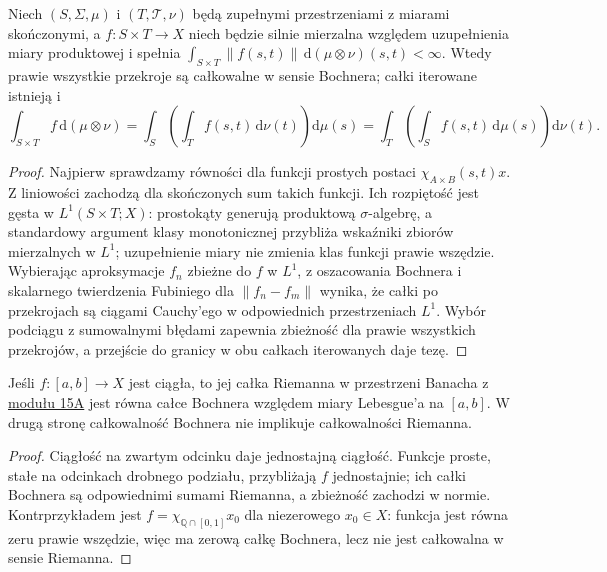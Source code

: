 \begin{twierdzenie}
\label{thm:bochner-fubini15b}
Niech $(S,\Sigma,\mu)$ i $(T,\mathcal T,\nu)$ będą
zupełnymi przestrzeniami z miarami skończonymi, a
$f:S\times T\to X$ niech będzie silnie mierzalna względem
uzupełnienia miary produktowej i spełnia
$\int_{S\times T}\|f(s,t)\|\,\mathrm d(\mu\otimes\nu)(s,t)<\infty$.
Wtedy prawie wszystkie przekroje są całkowalne w sensie
Bochnera; całki iterowane istnieją i
\[
 \int_{S\times T}f\,\mathrm d(\mu\otimes\nu)
 =\int_S\left(\int_Tf(s,t)\,\mathrm d\nu(t)\right)\mathrm d\mu(s)
 =\int_T\left(\int_Sf(s,t)\,\mathrm d\mu(s)\right)\mathrm d\nu(t).
\]
\end{twierdzenie}
\begin{proof}
Najpierw sprawdzamy równości dla funkcji prostych postaci
$\chi_{A\times B}(s,t)x$. Z liniowości zachodzą dla
skończonych sum takich funkcji. Ich rozpiętość jest gęsta
w $L^1(S\times T;X)$: prostokąty generują produktową
$\sigma$-algebrę, a standardowy argument klasy monotonicznej
przybliża wskaźniki zbiorów mierzalnych w $L^1$;
uzupełnienie miary nie zmienia klas funkcji prawie wszędzie.
Wybierając aproksymacje $f_n$ zbieżne do $f$ w $L^1$,
z oszacowania Bochnera i skalarnego twierdzenia Fubiniego
dla $\|f_n-f_m\|$ wynika, że całki po przekrojach są
ciągami Cauchy'ego w odpowiednich przestrzeniach $L^1$.
Wybór podciągu z sumowalnymi błędami zapewnia zbieżność
dla prawie wszystkich przekrojów, a przejście do granicy
w obu całkach iterowanych daje tezę.
\end{proof}

\begin{stwierdzenie}
\label{prop:riemann-bochner15b}
Jeśli $f:[a,b]\to X$ jest ciągła, to jej całka Riemanna
w przestrzeni Banacha z \hyperref[sec:integral-lcs15a]{modułu 15A} jest równa całce Bochnera
względem miary Lebesgue'a na $[a,b]$. W drugą stronę
całkowalność Bochnera nie implikuje całkowalności Riemanna.
\end{stwierdzenie}
\begin{proof}
Ciągłość na zwartym odcinku daje jednostajną ciągłość.
Funkcje proste, stałe na odcinkach drobnego podziału,
przybliżają $f$ jednostajnie; ich całki Bochnera są
odpowiednimi sumami Riemanna, a zbieżność zachodzi w normie.
Kontrprzykładem jest $f=\chi_{\mathbb Q\cap[0,1]}x_0$
dla niezerowego $x_0\in X$: funkcja jest równa zeru prawie
wszędzie, więc ma zerową całkę Bochnera, lecz nie jest
całkowalna w sensie Riemanna.
\end{proof}

